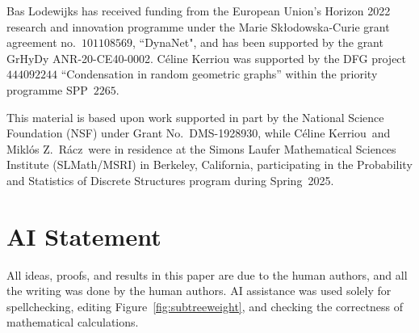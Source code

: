 \documentclass[11pt]{article}
\numberwithin{equation}{section}
\theoremstyle{definition}
\begin{document}
Bas Lodewijks has received funding from the European Union’s Horizon 2022 research and innovation programme under the Marie Sk\l{}odowska-Curie grant agreement no.~$101108569$, ``DynaNet", and has been supported by the grant GrHyDy ANR-20-CE40-0002. 
C\'eline Kerriou was supported by the DFG project~$444092244$ ``Condensation in random geometric graphs'' within the priority programme SPP~$2265$.

This material is based upon work supported in part by the National Science Foundation (NSF) under Grant No.~DMS-1928930, while C\'eline Kerriou\ and Mikl\'os Z.\ R\'acz\ were in residence at the Simons Laufer Mathematical Sciences Institute (SLMath/MSRI) in Berkeley, California, participating in the Probability and Statistics of Discrete Structures program during Spring~2025. 

\section*{AI Statement}

All ideas, proofs, and results in this paper are due to the human authors, and all the writing was done by the human authors. 
AI assistance was used solely for spellchecking, editing Figure~\ref{fig:subtreeweight}, and checking the correctness of mathematical calculations.








\end{document}
